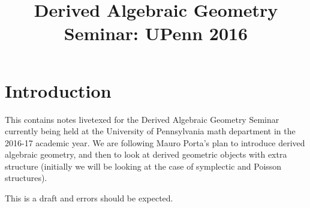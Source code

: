\documentclass[10pt,a4paper,reqno,oneside]{book} %
\title{Derived Algebraic Geometry Seminar: UPenn 2016}
\theoremstyle{plain}
\theoremstyle{definition}
\theoremstyle{remark}
\numberwithin{equation}{section}
\begin{document}
\maketitle
\tableofcontents

\chapter*{Introduction}
 

This contains notes livetexed for the Derived Algebraic Geometry Seminar currently being held at the University of Pennsylvania 
math department in the 2016-17 academic year.  We are following Mauro Porta's plan to introduce derived algebraic geometry, 
and then to look at derived geometric objects with extra structure (initially we will be looking at the case of symplectic 
and Poisson structures).

This is a draft and errors should be expected.



















\end{document}
